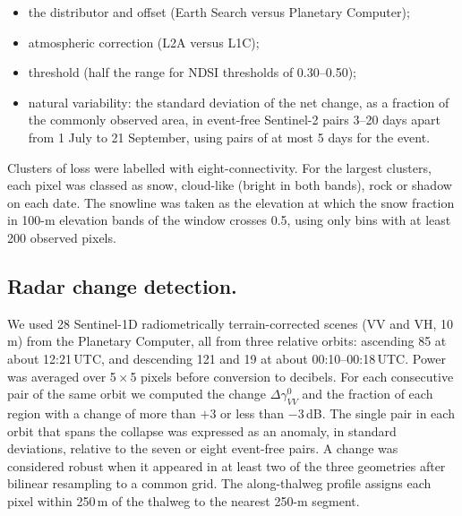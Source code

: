 \documentclass{nature}
\begin{document}
\begin{methods}
\begin{itemize}
\item the distributor and offset (Earth Search versus Planetary Computer);
\item atmospheric correction (L2A versus L1C);
\item threshold (half the range for NDSI thresholds of 0.30--0.50);
\item natural variability: the standard deviation of the net change, as a fraction of the commonly observed area, in event-free Sentinel-2 pairs 3--20 days apart from 1 July to 21 September, using pairs of at most 5 days for the event.
\end{itemize}
Clusters of loss were labelled with eight-connectivity. For the largest clusters, each pixel was classed as snow, cloud-like (bright in both bands), rock or shadow on each date. The snowline was taken as the elevation at which the snow fraction in 100-m elevation bands of the window crosses 0.5, using only bins with at least 200 observed pixels.

\subsection{Radar change detection.}
We used 28 Sentinel-1D radiometrically terrain-corrected scenes\cite{small2011} (VV and VH, 10\,m) from the Planetary Computer, all from three relative orbits: ascending 85 at about 12:21\,UTC, and descending 121 and 19 at about 00:10--00:18\,UTC. Power was averaged over 5\,$\times$\,5 pixels before conversion to decibels. For each consecutive pair of the same orbit we computed the change $\Delta\gamma^0_{VV}$ and the fraction of each region with a change of more than $+3$ or less than $-3$\,dB. The single pair in each orbit that spans the collapse was expressed as an anomaly, in standard deviations, relative to the seven or eight event-free pairs. A change was considered robust when it appeared in at least two of the three geometries after bilinear resampling to a common grid. The along-thalweg profile assigns each pixel within 250\,m of the thalweg to the nearest 250-m segment.


\end{methods}
\end{document}
